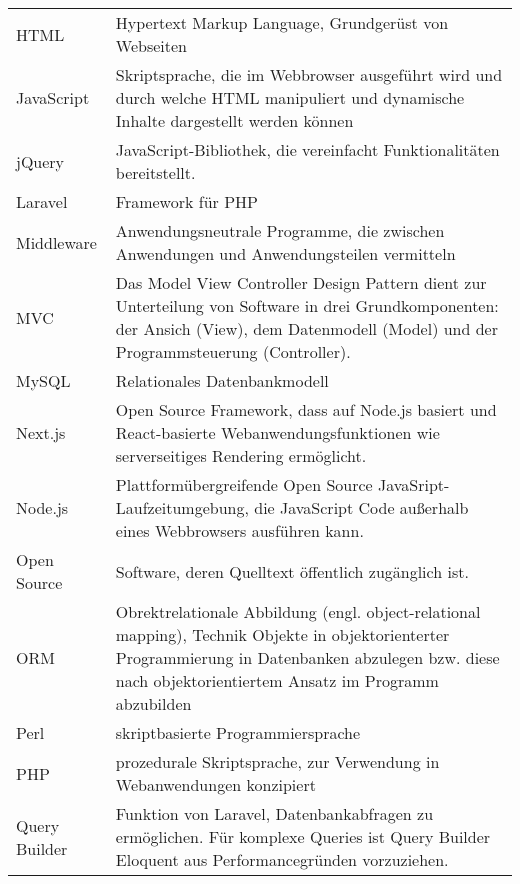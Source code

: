 \begin{longtable}{p{}p{}}
    HTML & Hypertext Markup Language, Grundgerüst von Webseiten\\

    JavaScript & Skriptsprache, die im Webbrowser ausgeführt wird und durch welche HTML manipuliert und dynamische Inhalte dargestellt werden können\\

    jQuery & JavaScript-Bibliothek, die vereinfacht Funktionalitäten bereitstellt.\\

    Laravel & Framework für PHP\\

    Middleware & Anwendungsneutrale Programme, die zwischen Anwendungen und Anwendungsteilen vermitteln\\

    MVC & Das Model View Controller Design Pattern dient zur Unterteilung von Software in drei Grundkomponenten: der Ansich (View), dem Datenmodell (Model) und der Programmsteuerung (Controller).\\

    MySQL & Relationales Datenbankmodell\\

    Next.js & Open Source Framework, dass auf Node.js basiert und React-basierte Webanwendungsfunktionen wie serverseitiges Rendering ermöglicht.\\

    Node.js & Plattformübergreifende Open Source JavaSript-Laufzeitumgebung, die JavaScript Code außerhalb eines Webbrowsers ausführen kann.\\

    Open Source & Software, deren Quelltext öffentlich zugänglich ist.\\

    ORM & Obrektrelationale Abbildung (engl. object-relational mapping), Technik Objekte in objektorienterter Programmierung in Datenbanken abzulegen bzw. diese nach objektorientiertem Ansatz im Programm abzubilden\\

    Perl & skriptbasierte Programmiersprache\\

    PHP & prozedurale Skriptsprache, zur Verwendung in Webanwendungen konzipiert\\

    Query Builder & Funktion von Laravel, Datenbankabfragen zu ermöglichen. Für komplexe Queries ist Query Builder Eloquent aus Performancegründen vorzuziehen.\\


\end{longtable}
